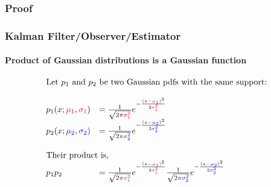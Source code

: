\subsubsection{Proof}
\begin{frame}\pw\Large
\frametitle{Kalman Filter/Observer/Estimator}
\framesubtitle{Product of Gaussian distributions is a Gaussian function}

\scriptsize
\begin{equation*}
\begin{array}{llll}
\multicolumn{2}{l}{\textrm{Let $p_1$ and $p_2$ be two Gaussian pdfs with the same support:}}\\\\
p_1(x; \muone, \sone)&=\frac{1}{\sqrt{2 \pi \varone}} e^{-\frac{(x-\muone)^2}{2 \varone}}\\
p_2(x; \mutwo, \stwo)&=\frac{1}{\sqrt{2 \pi \vartwo}} e^{-\frac{(x-\mutwo)^2}{2 \vartwo}}\\\\

\multicolumn{2}{l}{\textrm{Their product is,}}\\
p_1p_2 &=     \frac{1}{\sqrt{2 \pi \varone}} e^{-\frac{(x-\muone)^2}{2 \varone}}    \frac{1}{\sqrt{2 \pi \vartwo}} e^{-\frac{(x-\mutwo)^2}{2 \vartwo}}\\\\
\end{array}
\end{equation*}
%
\end{frame}




